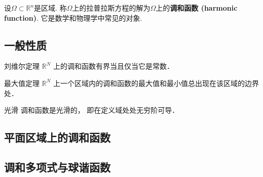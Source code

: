 

设$\Omega\subset\mathbb{R}^n$是区域. 称$\Omega$上的拉普拉斯方程的解为$\Omega$上的\textbf{调和函数 (harmonic function)}. 它是数学和物理学中常见的对象.


\subsection{一般性质}
\begin{theorem}{刘维尔定理}\label{HarFun_the1}
$\mathbb R^N$ 上的调和函数有界当且仅当它是常数．
\end{theorem}

\begin{theorem}{最大值定理}
$\mathbb R^N$ 上一个区域内的调和函数的最大值和最小值总出现在该区域的边界处．
\end{theorem}

\begin{theorem}{光滑}
调和函数是光滑的， 即在定义域处处无穷阶可导．
\end{theorem}



\subsection{平面区域上的调和函数}


\subsection{调和多项式与球谐函数}
